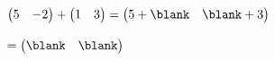 $\begin{pmatrix} 5 & -2 \end{pmatrix}+\begin{pmatrix} 1 & 3 \end{pmatrix}=\begin{pmatrix} 5+\blank & \blank+3 \end{pmatrix}$\par\noindent\phantom{$\begin{pmatrix} 5 & -2 \end{pmatrix}+\begin{pmatrix} 1 & 3 \end{pmatrix}$}$=\begin{pmatrix} \blank & \blank \end{pmatrix}$
